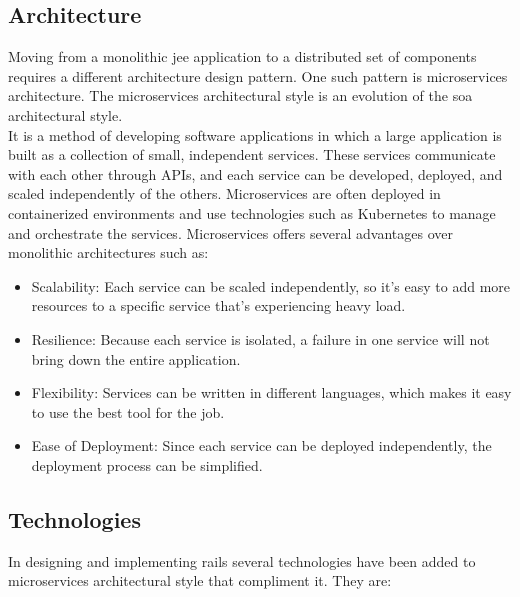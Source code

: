 \subsection{Architecture}
Moving from a monolithic \gls{jee} application to a distributed set of components requires a different architecture design pattern. One such pattern is microservices architecture. The microservices architectural style is an evolution of the \gls{soa} architectural style.\vspace{5mm} \\
It is a method of developing software applications in which a large application is built as a collection of small, independent services. These services communicate with each other through APIs, and each service can be developed, deployed, and scaled independently of the others. Microservices are often deployed in containerized environments and use technologies such as Kubernetes to manage and orchestrate the services. Microservices offers several advantages over monolithic architectures such as:
\begin{itemize}
\item Scalability: Each service can be scaled independently, so it's easy to add more resources to a specific service that's experiencing heavy load.
\item Resilience: Because each service is isolated, a failure in one service will not bring down the entire application.
\item Flexibility: Services can be written in different languages, which makes it easy to use the best tool for the job.
\item Ease of Deployment: Since each service can be deployed independently, the deployment process can be simplified.
\end{itemize}
\subsection{Technologies}\label{technologies}
In designing and implementing \gls{rails} several technologies have been added to microservices architectural style that compliment it. They are:
